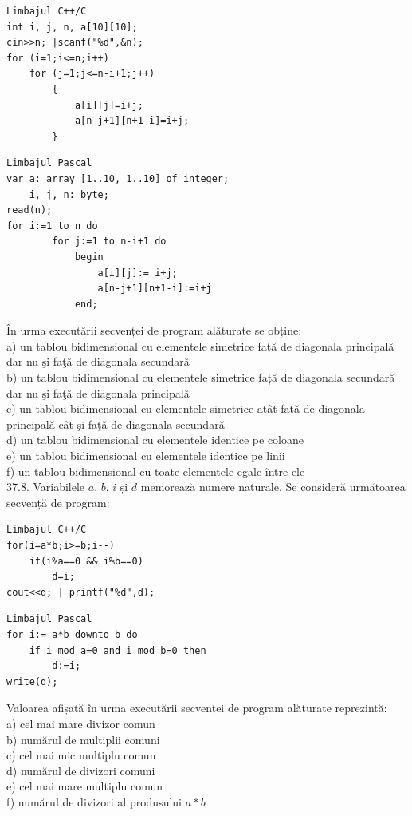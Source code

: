 \begin{itemize}
\begin{enumerate}
\begin{verbatim}
Limbajul C++/C
int i, j, n, a[10][10];
cin>>n; |scanf("%d",&n);
for (i=1;i<=n;i++)
    for (j=1;j<=n-i+1;j++)
        {
            a[i][j]=i+j;
            a[n-j+1][n+1-i]=i+j;
        }
\end{verbatim}
\begin{verbatim}
Limbajul Pascal
var a: array [1..10, 1..10] of integer;
    i, j, n: byte;
read(n);
for i:=1 to n do
        for j:=1 to n-i+1 do
            begin
                a[i][j]:= i+j;
                a[n-j+1][n+1-i]:=i+j
            end;
\end{verbatim}
În urma executării secvenței de program alăturate se obține:
\\
a) un tablou bidimensional cu elementele simetrice față de diagonala principală dar nu şi faţă de diagonala secundară
\\
b) un tablou bidimensional cu elementele simetrice față de diagonala secundară dar nu şi faţă de diagonala principală
\\
c) un tablou bidimensional cu elementele simetrice atât față de diagonala principală cât şi faţă de diagonala secundară
\\
d) un tablou bidimensional cu elementele identice pe coloane
\\
e) un tablou bidimensional cu elementele identice pe linii
\\
f) un tablou bidimensional cu toate elementele egale între ele
\\
37.8. Variabilele $a$, $b$, $i$ și $d$ memorează numere naturale. Se consideră următoarea secvență de program:
\begin{verbatim}
Limbajul C++/C
for(i=a*b;i>=b;i--)
    if(i%a==0 && i%b==0)
        d=i;
cout<<d; | printf("%d",d);
\end{verbatim}
\begin{verbatim}
Limbajul Pascal
for i:= a*b downto b do
    if i mod a=0 and i mod b=0 then
        d:=i;
write(d);
\end{verbatim}
Valoarea afișată în urma executării secvenței de program alăturate reprezintă:
\\
a) cel mai mare divizor comun
\\
b) numărul de multiplii comuni
\\
c) cel mai mic multiplu comun
\\
d) numărul de divizori comuni
\\
e) cel mai mare multiplu comun
\\
f) numărul de divizori al produsului $a*b$

\end{enumerate}
\end{itemize}
